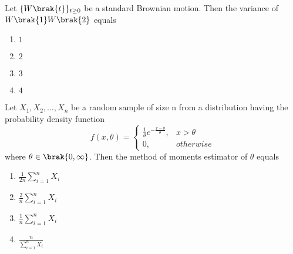 \item Let $\{W\brak{t}\}_{t\geq 0}$ be a standard Brownian motion. Then the variance of $W\brak{1}W\brak{2}$ equals
\begin{enumerate}
    \item $1$
    \item $2$
    \item $3$
    \item $4$
\end{enumerate}
\item Let $X_1,X_2,\ldots,X_n$ be a random sample of size n from a distribution having the probability density function
$$
f(x,\theta) = 
\begin{cases} 
    \frac{1}{\theta}e^{-\frac{x-\theta}{\theta}}, &  x > \theta \\ 
    0, &  otherwise 
\end{cases}
$$ where $\theta \in \brak{0,\infty}$. Then the method of moments estimator of $\theta$ equals
\begin{enumerate}
    \item $\frac{1}{2n}\sum_{i=1}^nX_i$
    \item $\frac{2}{n}\sum_{i=1}^nX_i$
    \item $\frac{1}{n}\sum_{i=1}^nX_i$
    \item $\frac{n}{\sum_{i=1}^{n}X_i}$
\end{enumerate}



